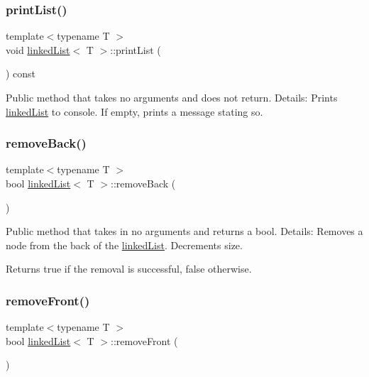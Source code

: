 \subsubsection{\texorpdfstring{print\+List()}{printList()}}
{\footnotesize\ttfamily template$<$typename T $>$ \\
void \hyperlink{classlinked_list}{linked\+List}$<$ T $>$\+::print\+List (\begin{DoxyParamCaption}{ }\end{DoxyParamCaption}) const}

Public method that takes no arguments and does not return. Details\+: Prints \hyperlink{classlinked_list}{linked\+List} to console. If empty, prints a message stating so. \mbox{\label{classlinked_list_a4c07d7c746d1aa4edc9d75b1e45987e9}} 
\subsubsection{\texorpdfstring{remove\+Back()}{removeBack()}}
{\footnotesize\ttfamily template$<$typename T $>$ \\
bool \hyperlink{classlinked_list}{linked\+List}$<$ T $>$\+::remove\+Back (\begin{DoxyParamCaption}{ }\end{DoxyParamCaption})}

Public method that takes in no arguments and returns a bool. Details\+: Removes a node from the back of the \hyperlink{classlinked_list}{linked\+List}. Decrements size. \begin{DoxyReturn}{Returns}
true if the removal is successful, false otherwise. 
\end{DoxyReturn}
\mbox{\label{classlinked_list_a950409c8ae9d09a1d930f5d9f1b84a23}} 
\subsubsection{\texorpdfstring{remove\+Front()}{removeFront()}}
{\footnotesize\ttfamily template$<$typename T $>$ \\
bool \hyperlink{classlinked_list}{linked\+List}$<$ T $>$\+::remove\+Front (\begin{DoxyParamCaption}{ }\end{DoxyParamCaption})}

